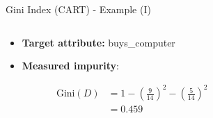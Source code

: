 \begin{frame}{Gini Index (CART) - Example (I)}
	\begin{columns}
		\begin{column}{0.45\textwidth}
			\begin{itemize}
				\item \textbf{Target attribute:} buys\_computer \medskip
				\item \textbf{Measured impurity}:
			\end{itemize}
			{
			\footnotesize
			\begin{align*}
				\text{Gini}(D) & = 1 - \left( \frac{9}{14} \right)^2 - \left( \frac{5}{14} \right)^2 \\
				               & = 0.459
			\end{align*}
			}
		\end{column}
		\begin{column}{0.45\textwidth}
			\vspace*{-0.5cm}
			\begin{center}
				\scalebox{0.7}{
					
				}
			\end{center}
		\end{column}
	\end{columns}
\end{frame}

